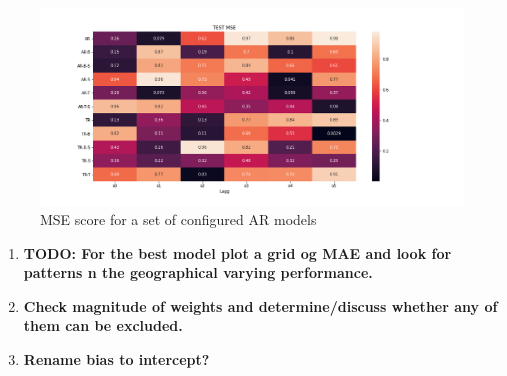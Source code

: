 \begin{table}[h]
    \centering
    \caption{Configuration of \acrshort{ar}-models. $\times$ denoted not applied, \checked denotes applied. \textbf{Bruk denne for tre eksempler.}}
    \label{tab:ar_model_config}
\end{table}

\begin{figure}
    \centering
    \includegraphics[scale = 0.5]{python_figs/MSE_score_AR_models.png}
    \caption{MSE score for a set of configured AR models}
    \label{fig:results_ar_models}
\end{figure}

\begin{enumerate}
    \item \textbf{TODO: For the best model plot a grid og MAE and look for patterns n the geographical varying performance.}
    \item \textbf{Check magnitude of weights and determine/discuss whether any of them can be excluded.}
    \item \textbf{Rename bias to intercept?}
\end{enumerate}


